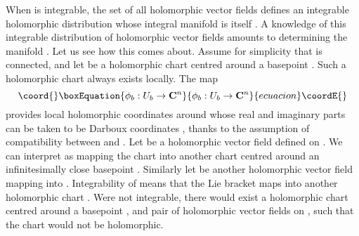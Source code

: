 \documentclass[a4paper,a4paper]{article}
\begin{document}
When \coordHE{} is integrable, the set of all holomorphic vector fields defines 
an integrable holomorphic distribution whose integral manifold is \coordHE{} 
itself \cite{KN}. A knowledge of this integrable  distribution
of holomorphic vector fields amounts to determining the manifold \coordHE{}.
Let us see how this comes about. Assume for simplicity that \coordHE{} is connected, 
and let \coordHE{} be a holomorphic chart centred around a basepoint \coordHE{}. 
Such a holomorphic chart always exists locally. The map 
\begin{equation}\coord{}\boxEquation{
\phi_b:U_b\rightarrow {\bf C}^{n}
\label{homeo}
}{
\phi_b:U_b\rightarrow {\bf C}^{n}
}{ecuacion}\coordE{}\end{equation} 
provides local 
holomorphic coordinates around \coordHE{} whose real and imaginary parts can be taken to be 
Darboux coordinates \coordHE{}, thanks to the assumption of 
compatibility between \coordHE{} and \coordHE{}. 
Let \coordHE{} be a holomorphic vector field defined 
on \coordHE{}. We can interpret \coordHE{} as mapping the chart \coordHE{} into 
another chart \coordHE{} centred around an infinitesimally 
close basepoint \coordHE{}. Similarly let \coordHE{} be another holomorphic vector field 
mapping \coordHE{} into \coordHE{}.
Integrability of \coordHE{} 
means that the Lie bracket \myHighlight{$[Z, W]$}\coordHE{} maps \coordHE{}
into another holomorphic chart \coordHE{}. 
Were \coordHE{} not integrable, there would exist a holomorphic chart \coordHE{} centred
around a basepoint \coordHE{}, and pair of holomorphic vector 
fields \coordHE{} on \coordHE{}, such that the chart \coordHE{}
would not be holomorphic.
\end{document}
